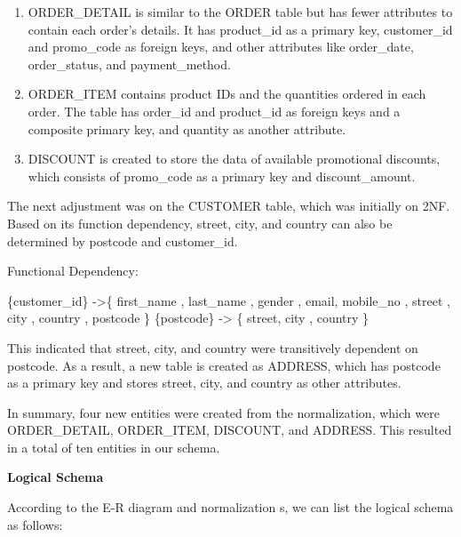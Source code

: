 \documentclass[
  letterpaper,
  DIV=11,
  numbers=noendperiod]{scrartcl}
\providecommand{\tightlist}{%
  \setlength{\itemsep}{0pt}\setlength{\parskip}{0pt}}\usepackage{longtable,booktabs,array}
\begin{document}
\begin{enumerate}
\def\labelenumi{\arabic{enumi}.}
\tightlist
\item
  ORDER\_DETAIL is similar to the ORDER table but has fewer attributes
  to contain each order's details. It has product\_id as a primary key,
  customer\_id and promo\_code as foreign keys, and other attributes
  like order\_date, order\_status, and payment\_method.
\item
  ORDER\_ITEM contains product IDs and the quantities ordered in each
  order. The table has order\_id and product\_id as foreign keys and a
  composite primary key, and quantity as another attribute.
\item
  DISCOUNT is created to store the data of available promotional
  discounts, which consists of promo\_code as a primary key and
  discount\_amount.
\end{enumerate}

The next adjustment was on the CUSTOMER table, which was initially on
2NF. Based on its function dependency, street, city, and country can
also be determined by postcode and customer\_id.

Functional Dependency:

\{customer\_id\} -\textgreater\{ first\_name , last\_name , gender ,
email, mobile\_no , street , city , country , postcode \} \{postcode\}
-\textgreater{} \{ street, city , country \}

This indicated that street, city, and country were transitively
dependent on postcode. As a result, a new table is created as ADDRESS,
which has postcode as a primary key and stores street, city, and country
as other attributes.

In summary, four new entities were created from the normalization, which
were ORDER\_DETAIL, ORDER\_ITEM, DISCOUNT, and ADDRESS. This resulted in
a total of ten entities in our schema.

\textbf{Logical Schema}

According to the E-R diagram and normalization s, we can list the
logical schema as follows:
\end{document}
